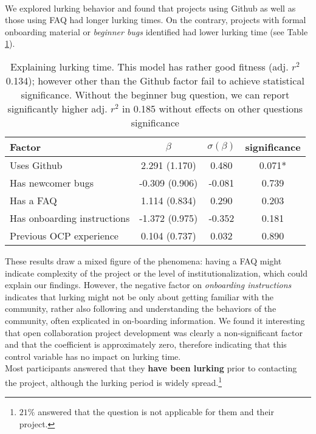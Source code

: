 \\
We explored lurking behavior and found that projects using Github as well as those using FAQ had longer lurking times. On the contrary, projects with formal onboarding material or {\it beginner bugs} identified had lower lurking time (see Table \ref{tab:lurking_time_regression}).

\begin{table}
\centering
\begin{tabular}{lccc}
Factor & $\beta$ & $\sigma(\beta)$ & significance \\
\hline 
Uses Github & 2.291 (1.170) & 0.480 & 0.071* \\ 
Has newcomer bugs & -0.309 (0.906) & -0.081 & 0.739 \\ 
Has a FAQ & 1.114 (0.834) & 0.290 & 0.203 \\ 
Has onboarding instructions & -1.372 (0.975) & -0.352 & 0.181 \\
\hline
Previous OCP experience & 0.104 (0.737) & 0.032 & 0.890 \\ 
\hline 
\end{tabular} 
\caption{Explaining lurking time. This model has rather good fitness (adj. $r^2$ 0.134); however other than the Github factor fail to achieve statistical significance. Without the beginner bug question, we can report significantly higher adj. $r^2$ in 0.185 without effects on other questions significance}
\label{tab:lurking_time_regression}
\end{table}

\noindent These results draw a mixed figure of the phenomena: having a FAQ might indicate complexity of the project or the level of institutionalization, which could explain our findings. However, the negative factor on {\it onboarding instructions} indicates that lurking might not be only about getting familiar with the community, rather also following and understanding the behaviors of the community, often explicated in on-boarding information.  We found it interesting that open collaboration project development was clearly a non-significant factor and that the coefficient is approximately zero, therefore indicating that this control variable has no impact on lurking time.\\

\noindent Most participants answered that they {\bf have been lurking} prior to contacting the project, although the lurking period is widely spread.\footnote{$21\%$ answered that the question is not applicable for them and their project.}  


